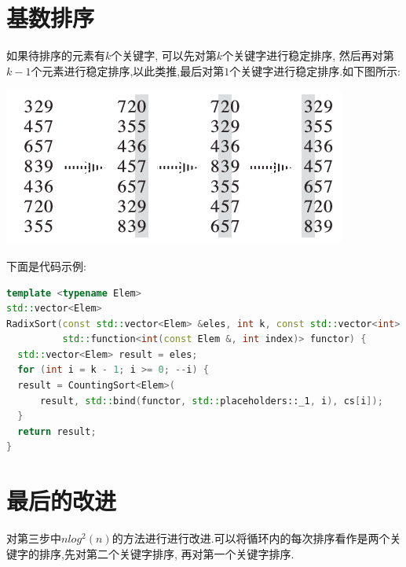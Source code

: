 \documentclass{article}
\begin{document}
\section{基数排序}
如果待排序的元素有$k$个关键字, 可以先对第$k$个关键字进行稳定排序, 然后再对第$k-1$个元素进行稳定排序,以此类推,最后对第$1$个关键字进行稳定排序.如下图所示: \par
\includegraphics[scale=0.6]{pic1.png} \par
下面是代码示例: \par
\begin{lstlisting}[language=C++, caption={Radix Sort}]
template <typename Elem>
std::vector<Elem>
RadixSort(const std::vector<Elem> &eles, int k, const std::vector<int> &cs,
          std::function<int(const Elem &, int index)> functor) {
  std::vector<Elem> result = eles;
  for (int i = k - 1; i >= 0; --i) {
  result = CountingSort<Elem>(
      result, std::bind(functor, std::placeholders::_1, i), cs[i]);
  }
  return result;
}

\end{lstlisting}

\section{最后的改进}
对第三步中$nlog^{2}(n)$的方法进行进行改进.可以将循环内的每次排序看作是两个关键字的排序,先对第二个关键字排序, 再对第一个关键字排序. \par
\begin{lstlisting}[language=C++, caption={Last Improvement}]

\end{lstlisting}
\end{document}

